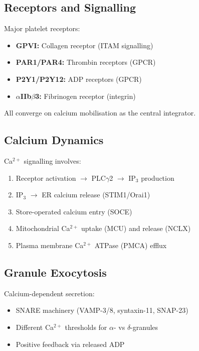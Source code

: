 \documentclass[11pt,a4paper]{report}
\begin{document}
\subsection{Receptors and Signalling}

Major platelet receptors:

\begin{itemize}
    \item \textbf{GPVI:} Collagen receptor (ITAM signalling)
    \item \textbf{PAR1/PAR4:} Thrombin receptors (GPCR)
    \item \textbf{P2Y1/P2Y12:} ADP receptors (GPCR)
    \item \textbf{$\alpha$IIb$\beta$3:} Fibrinogen receptor (integrin)
\end{itemize}

All converge on calcium mobilisation as the central integrator.

\subsection{Calcium Dynamics}

Ca$^{2+}$ signalling involves:

\begin{enumerate}
    \item Receptor activation $\to$ PLC$\gamma$2 $\to$ IP$_3$ production
    \item IP$_3$ $\to$ ER calcium release (STIM1/Orai1)
    \item Store-operated calcium entry (SOCE)
    \item Mitochondrial Ca$^{2+}$ uptake (MCU) and release (NCLX)
    \item Plasma membrane Ca$^{2+}$ ATPase (PMCA) efflux
\end{enumerate}

\subsection{Granule Exocytosis}

Calcium-dependent secretion:

\begin{itemize}
    \item SNARE machinery (VAMP-3/8, syntaxin-11, SNAP-23)
    \item Different Ca$^{2+}$ thresholds for $\alpha$- vs $\delta$-granules
    \item Positive feedback via released ADP
\end{itemize}
\end{document}
